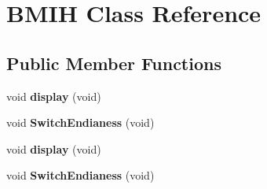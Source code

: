 \hypertarget{class_b_m_i_h}{\section{B\-M\-I\-H Class Reference}
\label{class_b_m_i_h}
}
\subsection*{Public Member Functions}
\begin{DoxyCompactItemize}
\item 
\hypertarget{class_b_m_i_h_a3204317506996229b6fefaacbb2d79cb}{void {\bfseries display} (void)}\label{class_b_m_i_h_a3204317506996229b6fefaacbb2d79cb}

\item 
\hypertarget{class_b_m_i_h_aece3c1b46fe1712b5926d0b47eb1739f}{void {\bfseries Switch\-Endianess} (void)}\label{class_b_m_i_h_aece3c1b46fe1712b5926d0b47eb1739f}

\item 
\hypertarget{class_b_m_i_h_a3204317506996229b6fefaacbb2d79cb}{void {\bfseries display} (void)}\label{class_b_m_i_h_a3204317506996229b6fefaacbb2d79cb}

\item 
\hypertarget{class_b_m_i_h_aece3c1b46fe1712b5926d0b47eb1739f}{void {\bfseries Switch\-Endianess} (void)}\label{class_b_m_i_h_aece3c1b46fe1712b5926d0b47eb1739f}

\end{DoxyCompactItemize}
